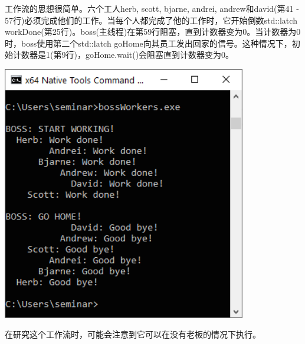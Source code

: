 工作流的思想很简单。六个工人herb, scott, bjarne, andrei, andrew和david(第41 - 57行)必须完成他们的工作。当每个人都完成了他的工作时，它开始倒数std::latch workDone(第25行)。boss(主线程)在第59行阻塞，直到计数器变为0。当计数器为0时，boss使用第二个std::latch goHome向其员工发出回家的信号。这种情况下，初始计数器是1(第9行)，goHome.wait()会阻塞直到计数器变为0。

\begin{center}
\includegraphics[width=0.8\textwidth]{content/3/chapter6/images/19.png}\\
\end{center}

在研究这个工作流时，可能会注意到它可以在没有老板的情况下执行。

